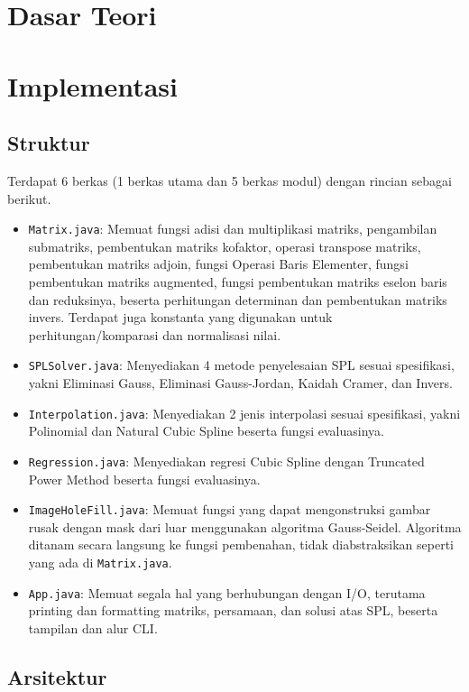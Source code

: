 \documentclass[12pt,a4paper]{report}
\begin{document}
\chapter{Dasar Teori}
\chapter{Implementasi}
\section{Struktur}

Terdapat 6 berkas (1 berkas utama dan 5 berkas modul) dengan rincian sebagai berikut.

\begin{itemize}
    \item \verb|Matrix.java|: Memuat fungsi adisi dan multiplikasi matriks, 
        pengambilan submatriks, pembentukan matriks kofaktor,
        operasi transpose matriks, pembentukan matriks adjoin, 
        fungsi Operasi Baris Elementer, fungsi pembentukan matriks augmented, 
        fungsi pembentukan matriks eselon baris dan reduksinya, beserta perhitungan 
        determinan dan pembentukan matriks invers. Terdapat juga konstanta yang digunakan
        untuk perhitungan/komparasi dan normalisasi nilai.
    \item \verb|SPLSolver.java|: Menyediakan 4 metode penyelesaian SPL sesuai spesifikasi, 
        yakni Eliminasi Gauss, Eliminasi Gauss-Jordan, Kaidah Cramer, dan Invers.
    \item \verb|Interpolation.java|: Menyediakan 2 jenis interpolasi sesuai spesifikasi, 
        yakni Polinomial dan Natural Cubic Spline beserta fungsi evaluasinya.
    \item \verb|Regression.java|: Menyediakan regresi Cubic Spline dengan Truncated Power 
        Method beserta fungsi evaluasinya.
    \item \verb|ImageHoleFill.java|: Memuat fungsi yang dapat mengonstruksi gambar rusak 
        dengan mask dari luar menggunakan algoritma Gauss-Seidel. Algoritma ditanam secara 
        langsung ke fungsi pembenahan, tidak diabstraksikan seperti yang ada di \verb|Matrix.java|.
    \item \verb|App.java|: Memuat segala hal yang berhubungan dengan I/O, terutama printing
        dan formatting matriks, persamaan, dan solusi atas SPL, beserta tampilan dan alur CLI.
\end{itemize}

\section{Arsitektur}
\end{document}
